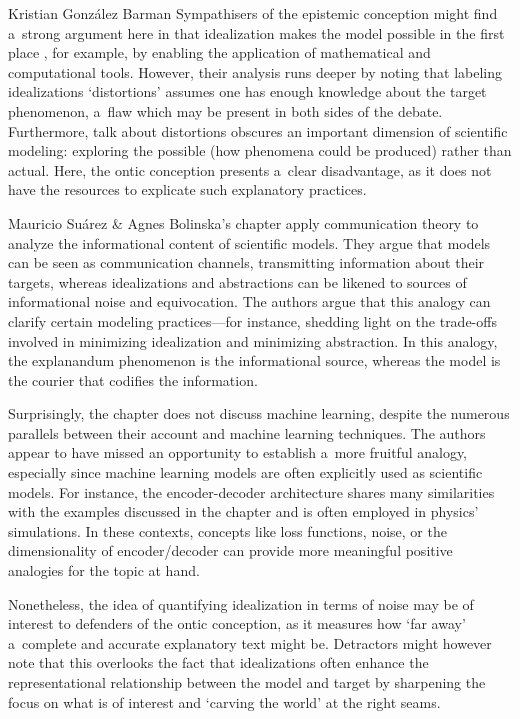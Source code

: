 \begin{recengenv}{Kristian González Barman}
Sympathisers of the epistemic conception might find a~strong argument here in that idealization makes the model possible in the first place
\parencite[][p.57]{cassini_models_2021}, %
 for example, by enabling the application of mathematical and computational tools. However, their analysis runs deeper by noting that labeling idealizations ‘distortions' assumes one has enough knowledge about the target phenomenon, a~flaw which may be present in both sides of the debate. Furthermore, talk about distortions obscures an important dimension of scientific modeling: exploring the possible (how phenomena could be produced) rather than actual. Here, the ontic conception presents a~clear disadvantage, as it does not have the resources to explicate such explanatory practices.

Mauricio Suárez \& Agnes Bolinska's chapter apply communication theory to analyze the informational content of scientific models. They argue that models can be seen as communication channels, transmitting information about their targets, whereas idealizations and abstractions can be likened to sources of informational noise and equivocation. The authors argue that this analogy can clarify certain modeling practices---for instance, shedding light on the trade-offs involved in minimizing idealization and minimizing abstraction. In this analogy, the explanandum phenomenon is the informational source, whereas the model is the courier that codifies the information.

\enlargethispage{-.5\baselineskip}

Surprisingly, the chapter does not discuss machine learning, despite the numerous parallels between their account and machine learning techniques. The authors appear to have missed an opportunity to establish a~more fruitful analogy, especially since machine learning models are often explicitly used as scientific models. For instance, the encoder-decoder architecture shares many similarities with the examples discussed in the chapter and is often employed in physics' simulations. In these contexts, concepts like loss functions, noise, or the dimensionality of encoder/decoder can provide more meaningful positive analogies for the topic at hand.

Nonetheless, the idea of quantifying idealization in terms of noise may be of interest to defenders of the ontic conception, as it measures how ‘far away' a~complete and accurate explanatory text might be. Detractors might however note that this overlooks the fact that idealizations often enhance the representational relationship between the model and target by sharpening the focus on what is of interest and ‘carving the world' at the right seams.


\end{recengenv}

